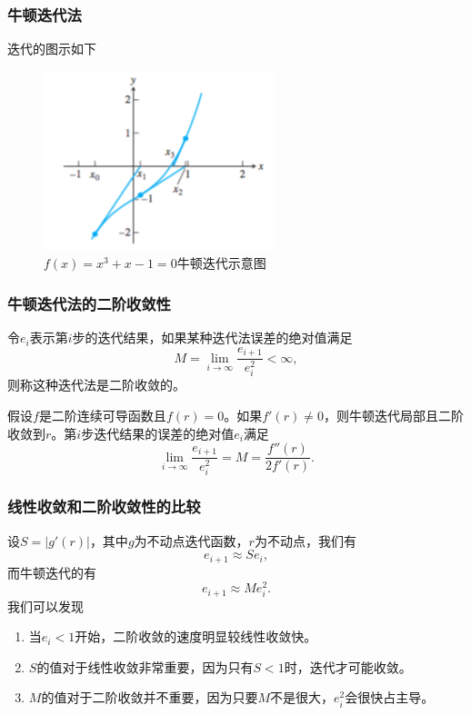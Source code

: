 \documentclass[10pt]{beamer}
\begin{document}
\begin{frame}
\frametitle{牛顿迭代法}
迭代的图示如下
\begin{figure}
\includegraphics[width=6 cm]{figs/Newton_Ex_1_Figure.png} 
\caption{$f(x) = x^3 + x -1 = 0$牛顿迭代示意图} 
\end{figure}
\end{frame}


\begin{frame}
\frametitle{牛顿迭代法的二阶收敛性}
\begin{definition}
令$e_i$表示第$i$步的迭代结果，如果某种迭代法误差的绝对值满足
\begin{equation}
M = \lim_{i \rightarrow \infty} \frac{e_{i+1}}{e_i^2} < \infty,
\end{equation}
则称这种迭代法是二阶收敛的。
\end{definition}

\begin{theorem}[牛顿迭代的二阶收敛性]
\label{thm: quadratic convergence Newton}
假设$f$是二阶连续可导函数且$f(r)=0$。如果$f'(r) \neq 0$，则牛顿迭代局部且二阶收敛到$r$。第$i$步迭代结果的误差的绝对值$e_i$满足
\begin{equation}
\lim_{i \rightarrow \infty} \frac{e_{i+1}}{e_i^2} = M = \frac{f''(r)}{2f'(r)}.
\end{equation}
\end{theorem}
\end{frame}


\begin{frame}
\frametitle{线性收敛和二阶收敛性的比较}
设$S = |g'(r)|$，其中$g$为不动点迭代函数，$r$为不动点，我们有
\begin{equation}
e_{i+1} \approx S e_i,
\end{equation}
而牛顿迭代的有
\begin{equation}
e_{i+1} \approx M e_i^2.
\end{equation}
我们可以发现
\begin{enumerate}
\item 当$e_i<1$开始，二阶收敛的速度明显较线性收敛快。
\item $S$的值对于线性收敛非常重要，因为只有$S<1$时，迭代才可能收敛。
\item $M$的值对于二阶收敛并不重要，因为只要$M$不是很大，$e_i^2$会很快占主导。
\end{enumerate}
\end{frame}
\end{document}
